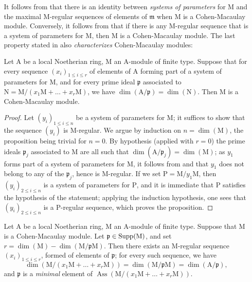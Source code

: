 \begin{remark}[16.5.7]
\label{0.16.5.7}
It follows from  that there is an identity between \emph{systems of parameters} for $\mathrm{M}$ and the maximal $\mathrm{M}$-regular sequences of elements of $\mathfrak{m}$ when $\mathrm{M}$ is a Cohen-Macaulay module.
Conversely, it follows from  that if there is any $\mathrm{M}$-regular sequence that is a system of parameters for $\mathrm{M}$, then $\mathrm{M}$ is a Cohen-Macaulay module.
The last property stated in  also \emph{characterizes} Cohen-Macaulay modules:
\end{remark}

\begin{proposition}[16.5.8]
\label{0.16.5.8}
Let $\mathrm{A}$ be a local Noetherian ring, $\mathrm{M}$ an $\mathrm{A}$-module of finite type.
Suppose that for every sequence $(x_i)_{1\leq i\leq r}$ of elements of $\mathrm{A}$ forming part of a system of parameters for $\mathrm{M}$, and for every prime ideal $\mathfrak{p}$ associated to $\mathrm{N}=\mathrm{M}/(x_1\mathrm{M}+\ldots+x_r\mathrm{M})$, we have $\dim(\mathrm{A}/\mathfrak{p})=\dim(\mathrm{N})$.
Then $\mathrm{M}$ is a Cohen-Macaulay module.
\end{proposition}

\begin{proof}
Let $(y_i)_{1\leq i\leq n}$ be a system of parameters for $\mathrm{M}$; it suffices to show that the sequence $(y_i)$ is $\mathrm{M}$-regular.
We argue by induction on $n=\dim(\mathrm{M})$, the proposition being trivial for $n=0$.
By hypothesis (applied with $r=0$) the prime ideals $\mathfrak{p}_j$ associated to $\mathrm{M}$ are all such that $\dim(\mathrm{A}/\mathfrak{p}_j)=\dim(\mathrm{M})$; as $y_1$ forms part of a system of parameters
for $\mathrm{M}$, it follows from  and  that $y_1$ does not belong to any of the $\mathfrak{p}_j$, hence is $\mathrm{M}$-regular.
If we set $\mathrm{P}=\mathrm{M}/y_1\mathrm{M}$, then $(y_i)_{2\leq i\leq n}$ is a system of parameters for $\mathrm{P}$, and it is immediate that $\mathrm{P}$ satisfies the hypothesis of the statement; applying the induction hypothesis, one sees that $(y_i)_{2\leq i\leq n}$ is a $\mathrm{P}$-regular sequence, which proves the proposition.
\end{proof}

\begin{proposition}[16.5.9]
\label{0.16.5.9}
Let $\mathrm{A}$ be a local Noetherian ring, $\mathrm{M}$ an $\mathrm{A}$-module of finite type.
Suppose that $\mathrm{M}$ is a Cohen-Macaulay module.
Let $\mathfrak{p}\in\operatorname{Supp}(\mathrm{M})$, and set $r=\dim(\mathrm{M})-\dim(\mathrm{M}/\mathfrak{p}\mathrm{M})$.
Then there exists an $\mathrm{M}$-regular sequence $(x_i)_{1\leq i\leq r}$, formed of elements of $\mathfrak{p}$; for every such sequence, we have
\[
  \dim(\mathrm{M}/(x_1\mathrm{M}+\ldots+x_r\mathrm{M}))=\dim(\mathrm{M}/\mathfrak{p}\mathrm{M})=\dim(\mathrm{A}/\mathfrak{p}),
\]
and $\mathfrak{p}$ is a \emph{minimal} element of $\operatorname{Ass}(\mathrm{M}/(x_1\mathrm{M}+\ldots+x_r\mathrm{M}))$.
\end{proposition}

